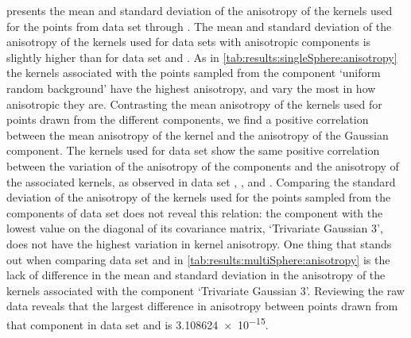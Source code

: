 	 presents the mean and standard deviation of the anisotropy of the kernels used for the points from data set \ferdosiTwo through \baakmanThree.
	The mean and standard deviation of the anisotropy of the kernels used for data sets with anisotropic components is slightly higher than for data set \ferdosiTwo and \ferdosiThree.
	As in \cref{tab:results:singleSphere:anisotropy} the kernels associated with the points sampled from the component `uniform random background' have the highest anisotropy, and vary the most in how anisotropic they are. 
	Contrasting the mean anisotropy of the kernels used for points drawn from the different components, we find a positive correlation between the mean anisotropy of the kernel and the anisotropy of the Gaussian component. 
		The kernels used for data set \baakmanTwo show the same positive correlation between the variation of the anisotropy of the components and the anisotropy of the associated kernels, as observed in data set \baakmanOne, \baakmanFour, and \baakmanFive. 
		Comparing the standard deviation of the anisotropy of the kernels used for the points sampled from the components of data set \baakmanThree does not reveal this relation: the component with the lowest value on the diagonal of its covariance matrix, `Trivariate Gaussian 3', does not have the highest variation in kernel anisotropy. 
	One thing that stands out when comparing data set \ferdosiThree and \baakmanThree in \cref{tab:results:multiSphere:anisotropy} is the lack of difference in the mean and standard deviation in the anisotropy of the kernels associated with the component `Trivariate Gaussian 3'. Reviewing the raw data reveals that the largest difference in anisotropy between points drawn from that component in data set \ferdosiThree and \baakmanThree is \num{3.108624e-15}.

